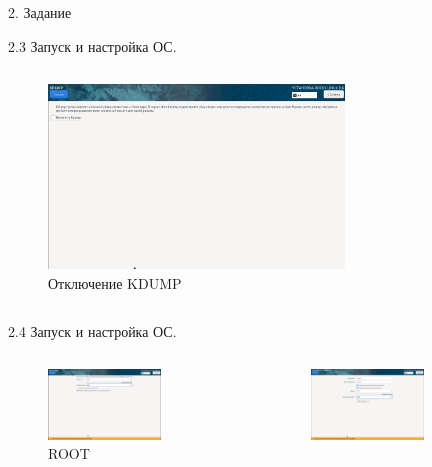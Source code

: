 \documentclass[
  ignorenonframetext,
  aspectratio=169,
]{beamer}
\begin{document}
\begin{frame}{2. Задание}
\begin{block}{2.3 Запуск и настройка ОС.}
\begin{columns}[c]
\begin{figure}
{\centering \includegraphics[width=0.7\textwidth,height=\textheight]{image/7.png}

}

\caption{Отключение KDUMP}

\end{figure}%
\end{columns}
\end{block}

\begin{block}{2.4 Запуск и настройка ОС.}
\label{ux437ux430ux43fux443ux441ux43a-ux438-ux43dux430ux441ux442ux440ux43eux439ux43aux430-ux43eux441.-1}
\begin{columns}[c]
\begin{figure}

{\centering \includegraphics[width=0.7\textwidth,height=\textheight]{image/10.png}

}

\caption{ROOT}

\end{figure}%
\begin{figure}

{\centering \includegraphics[width=0.7\textwidth,height=\textheight]{image/11.png}

}
\end{figure}
\end{columns}
\end{block}
\end{frame}
\end{document}
